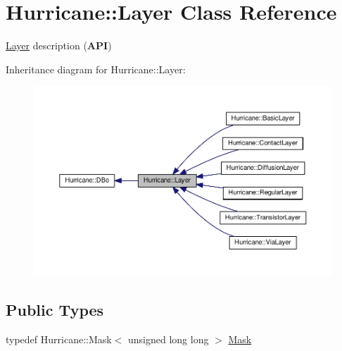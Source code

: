 \hypertarget{classHurricane_1_1Layer}{}\section{Hurricane\+:\+:Layer Class Reference}
\label{classHurricane_1_1Layer}


\hyperlink{classHurricane_1_1Layer}{Layer} description ({\bfseries A\+PI})  




Inheritance diagram for Hurricane\+:\+:Layer\+:\nopagebreak
\begin{figure}[H]
\begin{center}
\leavevmode
\includegraphics[width=350pt]{classHurricane_1_1Layer__inherit__graph}
\end{center}
\end{figure}
\subsection*{Public Types}
\begin{DoxyCompactItemize}
\item 
typedef Hurricane\+::\+Mask$<$ unsigned long long $>$ \hyperlink{classHurricane_1_1Layer_af5277c670637bd5d910237e7afe01a91}{Mask}
\end{DoxyCompactItemize}
